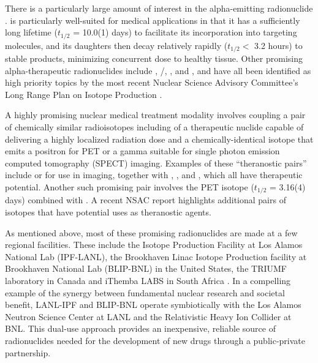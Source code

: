 \documentclass[letterpaper]{ar-1col}
\begin{document}
There is a particularly large amount of interest in the alpha-emitting radionuclide .
  is particularly well-suited for medical applications in that it has a sufficiently long lifetime ($t_{1/2}$ = 10.0(1) days) to facilitate its incorporation into targeting molecules, and its daughters then decay relatively rapidly ($t_{1/2}<$ 3.2 hours) to stable products, minimizing concurrent dose to healthy tissue.
Other promising alpha-therapeutic radionuclides include , /, ,  and , and have all been identified as high priority topics by the most recent Nuclear Science Advisory Committee's Long Range Plan on Isotope Production \cite{NSACIsotopesSubcommittee2015}.

A highly promising  nuclear medical treatment modality involves coupling a pair of chemically similar radioisotopes including of a therapeutic nuclide capable of delivering a highly localized radiation dose and a chemically-identical isotope that emits a positron for PET or a gamma suitable for single photon emission computed tomography (SPECT) imaging.
Examples of these \enquote{theranostic pairs} include  or  for use in imaging, together with , , and , which all have  therapeutic potential.
Another such promising  pair involves the PET isotope  ($t_{1/2}$ = 3.16(4) days) combined with .
 A recent NSAC report \cite{NSACIsotopesSubcommittee2015} highlights additional pairs of isotopes that have potential uses as theranostic agents.


As mentioned above, most of these promising radionuclides are made at a few regional facilities.
 These include the Isotope Production Facility at Los Alamos National Lab (IPF-LANL), the Brookhaven Linac Isotope Production facility at Brookhaven National Lab (BLIP-BNL) in the United States, the TRIUMF laboratory in Canada and iThemba LABS in South Africa \cite{Iae675,NSACIsotopesSubcommittee2015}.
 In a compelling example of the synergy between fundamental nuclear research and societal benefit, LANL-IPF and BLIP-BNL operate symbiotically with the Los Alamos Neutron Science Center at LANL and the Relativistic Heavy Ion Collider at BNL.
 This dual-use approach provides an inexpensive, reliable source of radionuclides needed for the development of new drugs through a public-private partnership.
\end{document}
